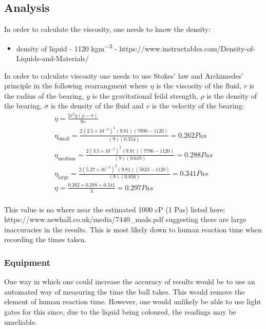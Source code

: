 \documentclass{article}
\begin{document}
\subsection{Analysis}

In order to calculate the viscosity, one needs to know the density:

\begin{itemize}
	\item density of liquid - 1120 \si{kgm^{-3}} - https://www.instructables.com/Density-of-Liquids-and-Materials/
\end{itemize}

In order to calculate viscosity one needs to use Stokes' law and Archimedes' principle in the following
rearrangment where $\eta$ is the viscosity of the fluid, $r$ is the radius of the bearing, $g$ is the 
gravitational feild strength, $\rho$ is the density of the bearing,
$\sigma$ is the density of the fluid and $v$ is the velocity of the bearing:
\begin{gather}
	\eta = \frac{2r^2g(\rho - \sigma)}{9v} \\
	\eta_{\text{small}} = \frac{2(2.5 \times 10^{-3})^2(9.81)(7900 - 1120)}{(9)(0.354)} = 0.262 \si{Pas} \\
	\eta_{\text{medium}} = \frac{2(3.5 \times 10^{-3})^2(9.81)(7796 - 1120)}{(9)(0.619)} = 0.288 \si{Pas} \\
	\eta_{\text{large}} = \frac{2(5.27 \times 10^{-3})^2(9.81)(5823 - 1120)}{(9)(0.836)} = 0.341 \si{Pas} \\
	\eta = \frac{0.262 + 0.288 + 0.341}{3} = 0.297 \si{Pas}\\
\end{gather}

This value is no where near the estimated 1000 \si{cP} (1 \si{Pas}) listed here: \\
https://www.newhall.co.uk/media/7440\_msds.pdf suggesting there are large inaccuracies
in the results. This is most likely down to human reaction time when recording the
times taken.

\subsubsection{Equipment}
One way in which one could increase the accuracy of results would be to use an automated way of measuring
the time the ball takes. This would remove the element of human reaction time. However, one would unlikely
be able to use light gates for this since, due to the liquid being coloured, the readings may be unreliable.
\end{document}
